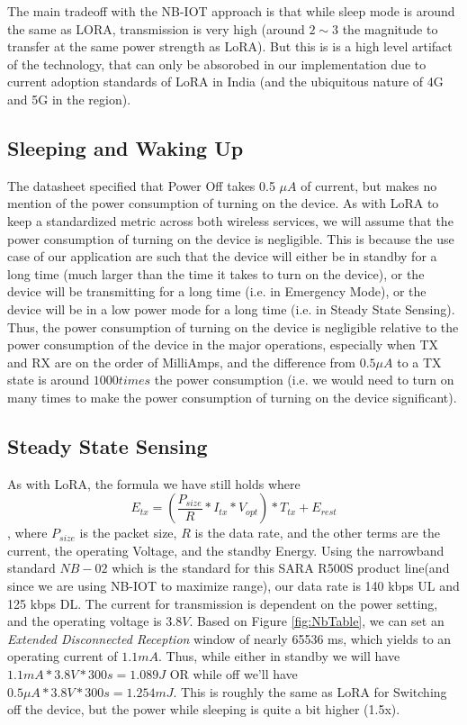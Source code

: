 The main tradeoff with the NB-IOT approach is that while sleep mode is around the same as LORA, transmission is very high (around $2\sim3$ the magnitude to transfer at the same power strength as LoRA). But this is is a high level artifact of the technology, that can only be absorobed in our implementation due to current adoption standards of LoRA in India (and the ubiquitous nature of 4G and 5G in the region).

\subsection{Sleeping and Waking Up}
The datasheet specified that Power Off takes 0.5 $\mu A$ of current, but makes no mention of the power consumption of turning on the device. As with LoRA to keep a standardized metric across both wireless services, we will assume that the power consumption of turning on the device is negligible. This is because the use case of our application are such that the device will either be in standby for a long time (much larger than the time it takes to turn on the device), or the device will be transmitting for a long time (i.e. in Emergency Mode), or the device will be in a low power mode for a long time (i.e. in Steady State Sensing). Thus, the power consumption of turning on the device is negligible relative to the power consumption of the device in the major operations, especially when TX and RX are on the order of MilliAmps, and the difference from $0.5 \mu A$ to a TX state is around $1000 times$ the power consumption (i.e. we would need to turn on many times to make the power consumption of turning on the device significant).

\subsection{Steady State Sensing}
As with LoRA, the formula we have still holds where $$E_{tx} = (\frac{P_{size}}{R} * I_{tx} * V_{opt}) * T_{tx} + E_{rest}$$, where $P_{size}$ is the packet size, $R$ is the data rate, and the other terms are the current, the operating Voltage, and the standby Energy. Using the narrowband standard $NB-02$ which is the standard for this SARA R500S product line(and since we are using NB-IOT to maximize range), our data rate is 140 kbps UL and 125 kbps DL. The current for transmission is dependent on the power setting, and the operating voltage is $3.8V$. Based on Figure \ref{fig:NbTable}, we can set an \textit{Extended Disconnected Reception} window of nearly 65536 ms, which yields to an operating current of $1.1 mA$. Thus, while either in standby we will have $1.1 mA * 3.8 V * 300s = 1.089 J$ OR while off we'll have $0.5 \mu A * 3.8 V * 300s = 1.254 mJ$. This is roughly the same as LoRA for Switching off the device, but the power while sleeping is quite a bit higher (1.5x). 

